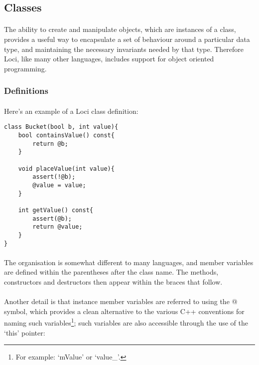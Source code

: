 \documentclass[12pt,twoside,notitlepage]{report}
\begin{document}
\clearpage

\subsection{Classes}

\paragraph{}
The ability to create and manipulate objects, which are instances of a class, provides a useful way to encapsulate a set of behaviour around a particular data type, and maintaining the necessary invariants needed by that type. Therefore Loci, like many other languages, includes support for object oriented programming.

\subsubsection{Definitions}

\paragraph{}
Here's an example of a Loci class definition:


\begin{lstlisting}
class Bucket(bool b, int value){
	bool containsValue() const{
		return @b;
	}
	
	void placeValue(int value){
		assert(!@b);
		@value = value;
	}
	
	int getValue() const{
		assert(@b);
		return @value;
	}
}
\end{lstlisting}


\paragraph{}
The organisation is somewhat different to many languages, and member variables are defined within the parentheses after the class name. The methods, constructors and destructors then appear within the braces that follow.

\paragraph{}
Another detail is that instance member variables are referred to using the @ symbol, which provides a clean alternative to the various C++ conventions for naming such variables\footnote{For example: `mValue' or `value\_'.}; such variables are also accessible through the use of the `this' pointer:
\end{document}
